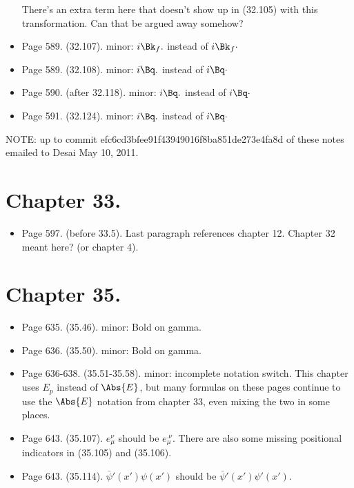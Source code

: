 \begin{itemize}
There's an extra term here that doesn't show up in (32.105) with this transformation.  Can that be argued away somehow?

\item Page 589.  (32.107).  minor: $i \Bk_f .$ instead of $i \Bk_f \cdot$
\item Page 589.  (32.108).  minor: $i \Bq .$ instead of $i \Bq \cdot$
\item Page 590.  (after 32.118).  minor: $i \Bq .$ instead of $i \Bq \cdot$
\item Page 591.  (32.124).  minor: $i \Bq .$ instead of $i \Bq \cdot$
\end{itemize}

NOTE: up to commit efc6cd3bfee91f43949016f8ba851de273e4fa8d of these notes emailed to Desai May 10, 2011.
 
\section{Chapter 33.}

\begin{itemize}
\item Page 597.  (before 33.5).  Last paragraph references chapter 12.  Chapter 32 meant here?  (or chapter 4).
\end{itemize}

\section{Chapter 35.}

\begin{itemize}
\item Page 635.  (35.46).  minor: Bold on gamma. 
\item Page 636.  (35.50).  minor: Bold on gamma. 
\item Page 636-638.  (35.51-35.58).  minor: incomplete notation switch.  This chapter uses $E_p$ instead of $\Abs{E}$, but many formulas on these pages continue to use the $\Abs{E}$ notation from chapter 33, even mixing the two in some places.
\item Page 643.  (35.107).  $e_\mu^{\nu}$ should be $e_\mu^{.\nu}$.  There are also some missing positional indicators in (35.105) and (35.106).
\item Page 643.  (35.114).  $\bar{\psi}'(x')\psi(x')$ should be $\bar{\psi}'(x')\psi'(x')$.
\end{itemize}

\EndArticle

